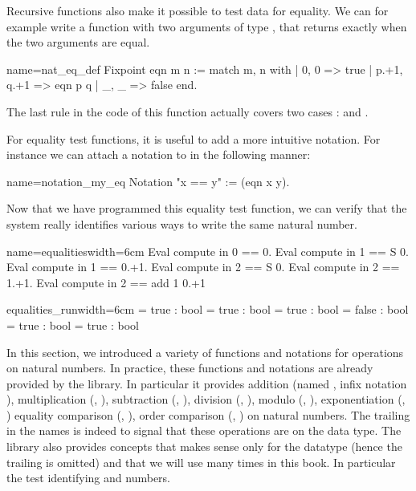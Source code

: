 Recursive functions also make it possible to test data for
equality. We can for example write a function with two arguments of
type , that
returns  exactly when the two arguments are equal.

\begin{coq}{name=nat_eq_def}{}
Fixpoint eqn m n :=
  match m, n with
  | 0, 0 => true
  | p.+1, q.+1 => eqn p q
  | _, _ => false
  end.
\end{coq}
The last rule in the code of this function actually covers two cases :
 and .

For equality test functions, it is useful to add a more intuitive
notation.  For instance we can attach a notation to  in
the following manner:

\begin{coq}{name=notation_my_eq}{}
Notation "x == y" := (eqn x y).
\end{coq}
Now
that we have programmed this equality test function, we can verify
that the \Coq{} system really identifies various ways to write the same
natural number.

\begin{coq}{name=equalities}{width=6cm}
Eval compute in 0 == 0.
Eval compute in 1 == S 0.
Eval compute in 1 == 0.+1.
Eval compute in 2 == S 0.
Eval compute in 2 == 1.+1.
Eval compute in 2 == add 1 0.+1
\end{coq}
\begin{coqout}{equalities_run}{width=6cm}
= true : bool
= true : bool
= true : bool
= false : bool
= true : bool
= true : bool
\end{coqout}

In this section, we introduced a variety of functions and notations
for operations on natural numbers.  In practice, these functions and
notations are already provided by the \mcbMC{} library.  In particular
it provides addition (named , infix notation \C{+}), 
multiplication
(, \C{*}), subtraction (, \C{-}), division (,
\C{\%/}),  modulo (, \C{\%\%}), exponentiation (, \C{\^})
equality comparison (, \C{==}), order
comparison (, \C{<=}) on natural numbers.  The trailing  in
the names is indeed to signal that these operations are on the  data
type.
The \mcbMC{} library also provides concepts that makes sense only
for the  datatype (hence the trailing  is omitted) and
that we will use many times in this book.  In particular the
test identifying  and  numbers.

